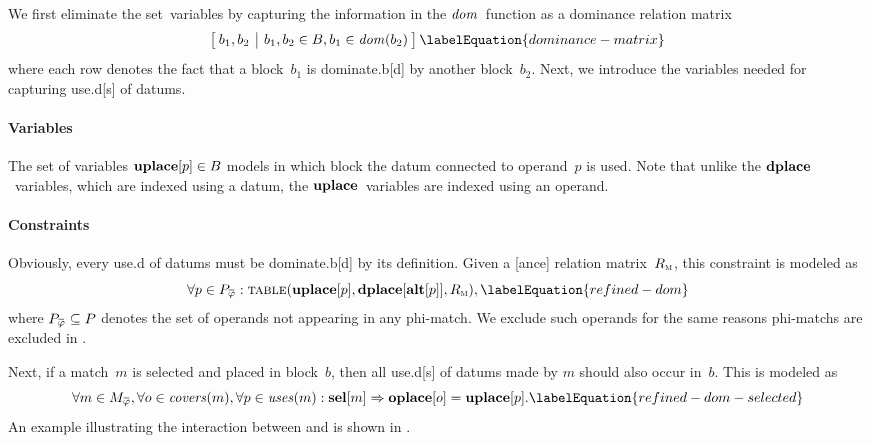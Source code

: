 We first eliminate the set~\glspl{variable} by capturing the information in the
$\operatorname{\textrm{\textit{dom}}}$~\gls{function} as a dominance relation matrix
%
\begin{equation}
  \begin{bmatrix}
    \begin{array}{@{\:}c|c@{\:}}
        b_1, b_2
      & b_1, b_2 \in \mBlockSet, b_1 \in \mDom(b_2)
    \end{array}
  \end{bmatrix}
  \labelEquation{dominance-matrix}
\end{equation}
%
where each row denotes the fact that a \gls{block}~$b_1$ is \gls{dominate.b}[d]
by another \gls{block}~$b_2$.
%
Next, we introduce the \glspl{variable} needed for capturing \gls{use.d}[s] of
\glspl{datum}.


\paragraph{Variables}

The set of \glspl{variable} \mbox{$\mVar{uplace}[p] \in \mBlockSet$} models in
which \gls{block} the \gls{datum} connected to \gls{operand}~$p$ is used.
%
Note that unlike the $\mVar{dplace}$~\glspl{variable}, which are indexed using a
\gls{datum}, the $\mVar{uplace}$~\glspl{variable} are indexed using an
\gls{operand}.


\paragraph{Constraints}

Obviously, every \gls{use.d} of \glspl{datum} must be \gls{dominate.b}[d] by its
definition.
%
Given a [ance] relation matrix~$R_{\textsc{m}}$, this
\gls{constraint} is modeled as
%
\begin{equation}
  \forall p \in \mPhiOperandCompSet :
  \mTable(\mVar{uplace}[p], \mVar{dplace}[\mVar{alt}[p]], \mDomMatrix),
  \labelEquation{refined-dom}
\end{equation}
%
where \mbox{$\mPhiOperandCompSet \subseteq \mOperandSet$} denotes the set of
\glspl{operand} not appearing in any \gls{phi-match}.
%
We exclude such \glspl{operand} for the same reasons \glspl{phi-match} are
excluded in .

Next, if a \gls{match}~$m$ is selected and placed in \gls{block}~$b$, then all
\gls{use.d}[s] of \glspl{datum} made by $m$ should also occur in~$b$.
%
This is modeled as
%
\begin{equation}
  \forall m \in \mPhiMatchCompSet,
  \forall o \in \mCovers(m),
  \forall p \in \mUses(m) :
  \mVar{sel}[m] \mImp \mVar{oplace}[o] = \mVar{uplace}[p].
  \labelEquation{refined-dom-selected}
\end{equation}
%
An example illustrating the interaction between  and
 is shown in .

